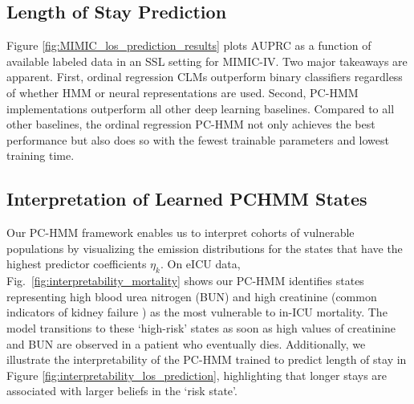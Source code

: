 







\subsection{Length of Stay Prediction}
Figure \ref{fig:MIMIC_los_prediction_results} plots AUPRC as a function of available labeled data in an SSL setting for MIMIC-IV.
Two major takeaways are apparent.
First, ordinal regression CLMs outperform binary classifiers regardless of whether HMM or neural representations are used.
Second, PC-HMM implementations outperform all other deep learning baselines. Compared to all other baselines, the ordinal regression PC-HMM not only achieves the best performance but also does so with the fewest trainable parameters and lowest training time. 





\subsection{Interpretation of Learned PCHMM States}
Our PC-HMM framework enables us to interpret cohorts of vulnerable populations by visualizing the emission distributions for the states that have the highest predictor coefficients $\eta_k$.
On eICU data, Fig.~\ref{fig:interpretability_mortality} shows our PC-HMM identifies states representing high blood urea nitrogen (BUN) and high creatinine (common indicators of kidney failure \citep{baha2021effect}) as the most vulnerable to in-ICU mortality. 
The model transitions to these `high-risk' states as soon as high values of creatinine and BUN are observed in a patient who eventually dies.
Additionally, we illustrate the interpretability of the PC-HMM trained to predict length of stay in Figure \ref{fig:interpretability_los_prediction}, highlighting that longer stays are associated with larger beliefs in the `risk state'.


